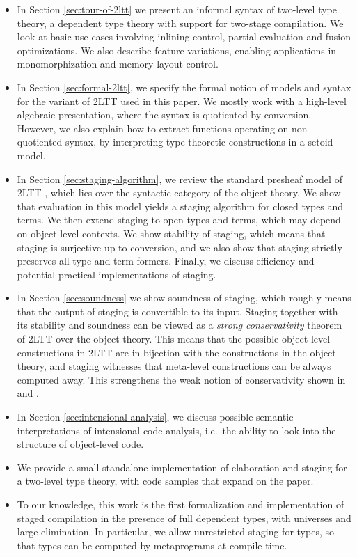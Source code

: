 \documentclass[acmsmall,anonymous,review]{acmart}
\theoremstyle{remark}
\begin{document}
\begin{itemize}
  \item In Section \ref{sec:tour-of-2ltt} we present an informal syntax of
    two-level type theory, a dependent type theory with support for two-stage
    compilation. We look at basic use cases involving inlining control, partial
    evaluation and fusion optimizations. We also describe feature variations,
    enabling applications in monomorphization and memory layout control.
  \item In Section \ref{sec:formal-2ltt}, we specify the formal notion of models
    and syntax for the variant of 2LTT used in this paper. We mostly work with a
    high-level algebraic presentation, where the syntax is quotiented by
    conversion. However, we also explain how to extract functions
    operating on non-quotiented syntax, by interpreting type-theoretic
    constructions in a setoid model.
  \item
    In Section \ref{sec:staging-algorithm}, we review the standard presheaf
    model of 2LTT \cite[Section~2.5.3]{twolevel}, which lies over the syntactic
    category of the object theory. We show that evaluation in this model yields
    a staging algorithm for closed types and terms. We then extend staging to
    open types and terms, which may depend on object-level contexts. We show
    stability of staging, which means that staging is surjective up to
    conversion, and we also show that staging strictly preserves all type and
    term formers. Finally, we discuss efficiency and potential practical implementations
    of staging.
  \item
    In Section \ref{sec:soundness} we show soundness of staging, which roughly means that
    the output of staging is convertible to its input. Staging together with
    its stability and soundness can be viewed as a \emph{strong conservativity}
    theorem of 2LTT over the object theory. This means that the possible
    object-level constructions in 2LTT are in bijection with the constructions
    in the object theory, and staging witnesses that meta-level constructions
    can be always computed away. This strengthens the weak notion of
    conservativity shown in \cite{capriotti2017models} and \cite{twolevel}.
  \item
    In Section \ref{sec:intensional-analysis}, we discuss possible semantic
    interpretations of intensional code analysis, i.e.\ the ability to look into
    the structure of object-level code.
  \item We provide a small standalone implementation of elaboration and staging
    for a two-level type theory, with code samples that expand on the paper.
  \item To our knowledge, this work is the first formalization and implementation of
    staged compilation in the presence of full dependent types, with
    universes and large elimination. In particular, we allow unrestricted
    staging for types, so that types can be computed by metaprograms at compile
    time.
\end{itemize}
\end{document}
